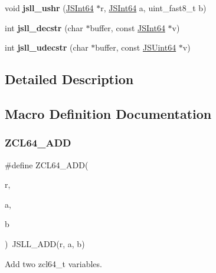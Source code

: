 \begin{DoxyCompactItemize}
void {\bfseries jsll\+\_\+ushr} (\hyperlink{struct_j_s_int64}{J\+S\+Int64} $\ast$r, \hyperlink{struct_j_s_int64}{J\+S\+Int64} a, uint\+\_\+fast8\+\_\+t b)
\item 
\mbox{\label{group__zcl__64_gaaeb3f577d08fb658090c74ce03da319a}} 
int {\bfseries jsll\+\_\+decstr} (char $\ast$buffer, const \hyperlink{struct_j_s_int64}{J\+S\+Int64} $\ast$v)
\item 
\mbox{\label{group__zcl__64_gaf41ea39427421502a4c90a5cd5f62cb7}} 
int {\bfseries jsll\+\_\+udecstr} (char $\ast$buffer, const \hyperlink{struct_j_s_int64}{J\+S\+Uint64} $\ast$v)
\end{DoxyCompactItemize}


\subsection{Detailed Description}


\subsection{Macro Definition Documentation}
\mbox{\label{group__zcl__64_gaa0b854087abee42e1bf908a133385f8d}} 
\subsubsection{\texorpdfstring{Z\+C\+L64\+\_\+\+A\+DD}{ZCL64\_ADD}}
{\footnotesize\ttfamily \#define Z\+C\+L64\+\_\+\+A\+DD(\begin{DoxyParamCaption}\item[{}]{r,  }\item[{}]{a,  }\item[{}]{b }\end{DoxyParamCaption})~J\+S\+L\+L\+\_\+\+A\+DD(r, a, b)}



Add two zcl64\+\_\+t variables. 



